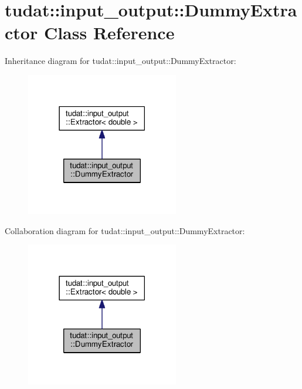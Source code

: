 \hypertarget{classtudat_1_1input__output_1_1DummyExtractor}{}\section{tudat\+:\+:input\+\_\+output\+:\+:Dummy\+Extractor Class Reference}
\label{classtudat_1_1input__output_1_1DummyExtractor}


Inheritance diagram for tudat\+:\+:input\+\_\+output\+:\+:Dummy\+Extractor\+:
\nopagebreak
\begin{figure}[H]
\begin{center}
\leavevmode
\includegraphics[width=189pt]{classtudat_1_1input__output_1_1DummyExtractor__inherit__graph}
\end{center}
\end{figure}


Collaboration diagram for tudat\+:\+:input\+\_\+output\+:\+:Dummy\+Extractor\+:
\nopagebreak
\begin{figure}[H]
\begin{center}
\leavevmode
\includegraphics[width=189pt]{classtudat_1_1input__output_1_1DummyExtractor__coll__graph}
\end{center}
\end{figure}
